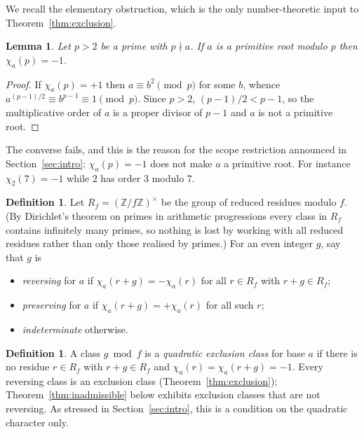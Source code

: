 \documentclass[11pt,reqno]{amsart}
\theoremstyle{plain}
\newtheorem{lemma}[theorem]{Lemma}
\theoremstyle{definition}
\newtheorem{definition}[theorem]{Definition}
\newcommand{\Z}{\mathbb{Z}}
\begin{document}
We recall the elementary obstruction, which is the only number-theoretic input
to Theorem~\ref{thm:exclusion}.

\begin{lemma}
\label{lem:obstruction}
Let $p > 2$ be a prime with $p \nmid a$. If $a$ is a primitive root modulo $p$
then $\chi_a(p) = -1$.
\end{lemma}

\begin{proof}
If $\chi_a(p) = +1$ then $a \equiv b^2 \pmod p$ for some $b$, whence
$a^{(p-1)/2} \equiv b^{p-1} \equiv 1 \pmod p$. Since $p > 2$, $(p-1)/2 < p-1$,
so the multiplicative order of $a$ is a proper divisor of $p - 1$ and $a$ is not
a primitive root.
\end{proof}

The converse fails, and this is the reason for the scope restriction announced
in Section~\ref{sec:intro}: $\chi_a(p) = -1$ does not make $a$ a primitive
root. For instance $\chi_2(7) = -1$ while $2$ has order $3$ modulo $7$.

\begin{definition}
\label{def:shift}
Let $R_f = (\Z/f\Z)^\times$ be the group of reduced residues modulo $f$. (By
Dirichlet's theorem on primes in arithmetic progressions every class in $R_f$
contains infinitely many primes, so nothing is lost by working with all reduced
residues rather than only those realised by primes.) For an even integer $g$,
say that $g$ is
\begin{itemize}
\item \emph{reversing} for $a$ if $\chi_a(r+g) = -\chi_a(r)$ for all $r \in R_f$
      with $r + g \in R_f$;
\item \emph{preserving} for $a$ if $\chi_a(r+g) = +\chi_a(r)$ for all such $r$;
\item \emph{indeterminate} otherwise.
\end{itemize}
\end{definition}

\begin{definition}
\label{def:exclusion}
A class $g \bmod f$ is a \emph{quadratic exclusion class} for base $a$ if there
is no residue $r \in R_f$ with $r + g \in R_f$ and
$\chi_a(r) = \chi_a(r+g) = -1$. Every reversing class is an exclusion class
(Theorem~\ref{thm:exclusion}); Theorem~\ref{thm:inadmissible} below exhibits
exclusion classes that are not reversing. As stressed in
Section~\ref{sec:intro}, this is a condition on the quadratic character only.
\end{definition}
\end{document}
